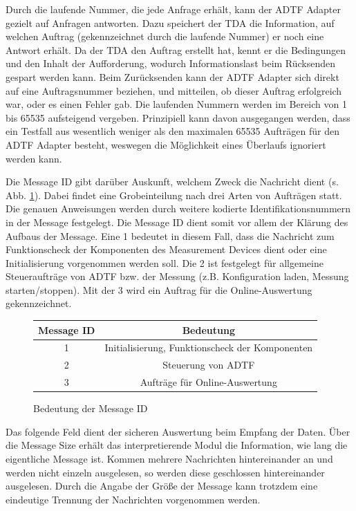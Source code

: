 \documentclass[12pt,a4paper]{report}
\begin{document}
Durch die laufende Nummer, die jede Anfrage erhält, kann der ADTF Adapter gezielt auf Anfragen antworten. Dazu speichert der TDA die Information, auf welchen Auftrag (gekennzeichnet durch die laufende Nummer) er noch eine Antwort erhält. Da der TDA den Auftrag erstellt hat, kennt er die Bedingungen und den Inhalt der Aufforderung, wodurch Informationslast beim Rücksenden gespart werden kann. Beim Zurücksenden kann der ADTF Adapter sich direkt auf eine Auftragsnummer beziehen, und mitteilen, ob dieser Auftrag erfolgreich war, oder es einen Fehler gab. Die laufenden Nummern werden im Bereich von 1 bis 65535 aufsteigend vergeben. Prinzipiell kann davon ausgegangen werden, dass ein Testfall aus wesentlich weniger als den maximalen 65535 Aufträgen für den ADTF Adapter besteht, weswegen die Möglichkeit eines Überlaufs ignoriert werden kann.

Die Message ID gibt darüber Auskunft, welchem Zweck die Nachricht dient (s. Abb. \ref{tab:Bedeutung der Message ID}). Dabei findet eine Grobeinteilung nach drei Arten von Aufträgen statt. Die genauen Anweisungen werden durch weitere kodierte Identifikationsnummern in der Message festgelegt. Die Message ID dient somit vor allem der Klärung des Aufbaus der Message. Eine 1 bedeutet in diesem Fall, dass die Nachricht zum Funktionscheck der Komponenten des Measurement Devices dient oder eine Initialisierung vorgenommen werden soll. Die 2 ist festgelegt für allgemeine Steueraufträge von ADTF bzw. der Messung (z.B. Konfiguration laden, Messung starten/stoppen). Mit der 3 wird ein Auftrag für die Online-Auswertung gekennzeichnet.
\begin{figure}[H]
\begin{center}
\begin{tabular}{|c|c|}
\hline
Message ID & Bedeutung \\
\hline
\hline
 1 & Initialisierung, Funktionscheck der Komponenten \\
\hline
 2 & Steuerung von ADTF \\
\hline
 3 & Aufträge für Online-Auswertung \\
\hline
\end{tabular}
\caption{Bedeutung der Message ID}\label{tab:Bedeutung der Message ID}
\end{center}
\end{figure}
\noindent Das folgende Feld dient der sicheren Auswertung beim Empfang der Daten. Über die Message Size erhält das interpretierende Modul die Information, wie lang die eigentliche Message ist. Kommen mehrere Nachrichten hintereinander an und werden nicht einzeln ausgelesen, so werden diese geschlossen hintereinander ausgelesen. Durch die Angabe der Größe der Message kann trotzdem eine eindeutige Trennung der Nachrichten vorgenommen werden.
\end{document}
